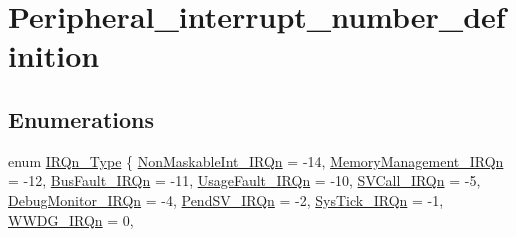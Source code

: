 \hypertarget{group___peripheral__interrupt__number__definition}{}\section{Peripheral\+\_\+interrupt\+\_\+number\+\_\+definition}
\label{group___peripheral__interrupt__number__definition}
\subsection*{Enumerations}
\begin{DoxyCompactItemize}
\item 
enum \mbox{\hyperlink{group___peripheral__interrupt__number__definition_ga7e1129cd8a196f4284d41db3e82ad5c8}{I\+R\+Qn\+\_\+\+Type}} \{ \newline
\mbox{\hyperlink{group___peripheral__interrupt__number__definition_gga7e1129cd8a196f4284d41db3e82ad5c8ade177d9c70c89e084093024b932a4e30}{Non\+Maskable\+Int\+\_\+\+I\+R\+Qn}} = -\/14, 
\mbox{\hyperlink{group___peripheral__interrupt__number__definition_gga7e1129cd8a196f4284d41db3e82ad5c8a33ff1cf7098de65d61b6354fee6cd5aa}{Memory\+Management\+\_\+\+I\+R\+Qn}} = -\/12, 
\mbox{\hyperlink{group___peripheral__interrupt__number__definition_gga7e1129cd8a196f4284d41db3e82ad5c8a8693500eff174f16119e96234fee73af}{Bus\+Fault\+\_\+\+I\+R\+Qn}} = -\/11, 
\mbox{\hyperlink{group___peripheral__interrupt__number__definition_gga7e1129cd8a196f4284d41db3e82ad5c8a6895237c9443601ac832efa635dd8bbf}{Usage\+Fault\+\_\+\+I\+R\+Qn}} = -\/10, 
\newline
\mbox{\hyperlink{group___peripheral__interrupt__number__definition_gga7e1129cd8a196f4284d41db3e82ad5c8a4ce820b3cc6cf3a796b41aadc0cf1237}{S\+V\+Call\+\_\+\+I\+R\+Qn}} = -\/5, 
\mbox{\hyperlink{group___peripheral__interrupt__number__definition_gga7e1129cd8a196f4284d41db3e82ad5c8a8e033fcef7aed98a31c60a7de206722c}{Debug\+Monitor\+\_\+\+I\+R\+Qn}} = -\/4, 
\mbox{\hyperlink{group___peripheral__interrupt__number__definition_gga7e1129cd8a196f4284d41db3e82ad5c8a03c3cc89984928816d81793fc7bce4a2}{Pend\+S\+V\+\_\+\+I\+R\+Qn}} = -\/2, 
\mbox{\hyperlink{group___peripheral__interrupt__number__definition_gga7e1129cd8a196f4284d41db3e82ad5c8a6dbff8f8543325f3474cbae2446776e7}{Sys\+Tick\+\_\+\+I\+R\+Qn}} = -\/1, 
\newline
\mbox{\hyperlink{group___peripheral__interrupt__number__definition_gga7e1129cd8a196f4284d41db3e82ad5c8a971089d7566ef902dfa0c80ac3a8fd52}{W\+W\+D\+G\+\_\+\+I\+R\+Qn}} = 0, 

\end{DoxyCompactItemize}
